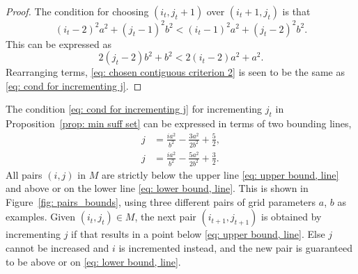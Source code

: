 \documentclass[12pt, a4paper]{article}
\newcommand{\tiles}{t} %
\newcommand{\mss}{M}
\begin{document}
\begin{proof}
The condition for choosing $(i_t,j_t+1)$ over $(i_t+1,j_t)$ is that
\begin{equation}
\label{eq: chosen contiguous criterion 1}
(i_\tiles-2)^2 a^2 + (j_\tiles-1)^2 b^2 < (i_\tiles-1)^2 a^2 + (j_\tiles-2)^2 b^2.
\end{equation}
This can be expressed as
\begin{equation}
\label{eq: chosen contiguous criterion 2}
2(j_\tiles-2)b^2 + b^2 < 2(i_\tiles-2)a^2 + a^2.
\end{equation}
Rearranging terms, \eqref{eq: chosen contiguous criterion 2} is seen to be the same as \eqref{eq: cond for incrementing j}.
\end{proof}

The condition \eqref{eq: cond for incrementing j} for incrementing $j_\tiles$ in Proposition~\ref{prop: min suff set} can be expressed in terms of two bounding lines,
\begin{align}
\label{eq: upper bound, line}
j &= \frac{i a^2}{b^2} - \frac{3a^2}{2b^2} + \frac 5 2, \\
\label{eq: lower bound, line}
j &= \frac{i a^2}{b^2} - \frac{5a^2}{2b^2} + \frac 3 2.
\end{align}
All pairs $(i,j)$ in $\mss$ are strictly below the upper line \eqref{eq: upper bound, line} and above or on the lower line \eqref{eq: lower bound, line}. This is shown in Figure~\ref{fig: pairs_bounds}, using three different pairs of grid parameters $a$, $b$ as examples. Given $(i_\tiles,j_\tiles) \in \mss$, the next pair $(i_{\tiles+1},j_{\tiles+1})$ is obtained by incrementing $j$ if that results in a point below \eqref{eq: upper bound, line}. Else $j$ cannot be increased and $i$ is incremented instead, and the new pair is guaranteed to be above or on \eqref{eq: lower bound, line}.
\end{document}
